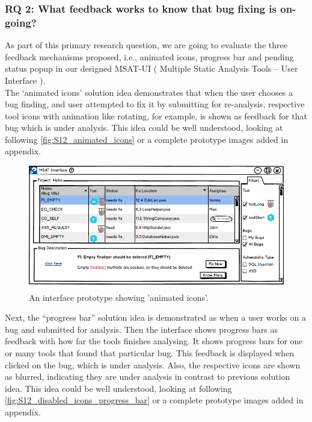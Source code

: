 \subsubsection{RQ 2: What feedback works to know that bug fixing is on-going?}

As part of this primary research question, we are going to evaluate the three feedback mechanisms proposed, i.e., animated icons, progress bar and pending status popup in our designed MSAT-UI ( Multiple Static Analysis Tools – User Interface ). \\

The ‘animated icons’ solution idea demonstrates that when the user chooses a bug finding, and user attempted to fix it by submitting for re-analysis,  respective tool icons with animation like rotating, for example, is shown as feedback for that bug which is under analysis. This idea could be well understood, looking at following \autoref{fig:S12_animated_icons} or a complete prototype images added in appendix. \\

\begin{figure}[hbt!]
	\centering
	\includegraphics[width=\linewidth]{figures/solution_ideas_snaps/S12_animated_icons}
	\caption{An interface prototype showing 'animated icons'.}
	\label{fig:S12_animated_icons}
\end{figure}

Next, the “progress bar” solution idea is demonstrated as when a user works on a  bug and submitted for analysis.  Then the interface shows progress bars as feedback with how far the tools finishes analysing. It shows progress bars for one or many tools that found that particular bug. This feedback is displayed when clicked on the bug, which is under analysis. Also, the respective icons are shown as blurred, indicating they are under analysis in contrast to previous solution idea. This idea could be well understood, looking at following \autoref{fig:S12_disabled_icons_progress_bar} or a complete prototype images added in appendix. \\



